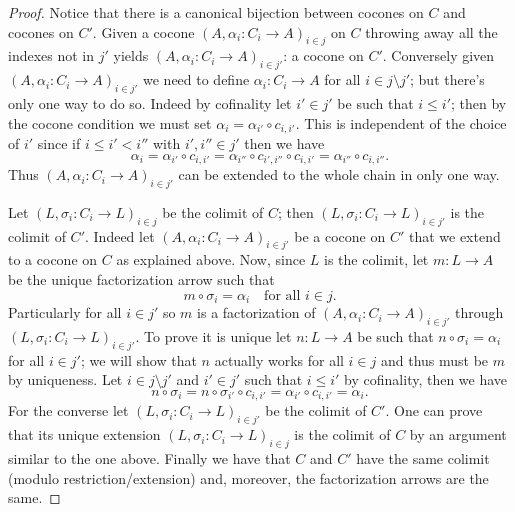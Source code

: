\documentclass[letterpaper, 11pt, oneside]{memoir}
\theoremstyle{myteo}
\numberwithin{equation}{section}
\begin{document}
\begin{proof}
  Notice that there is a canonical bijection between cocones on \(C\) and cocones on \(C'\).
  Given a cocone \((A, \alpha_i : C_i \to A)_{i \in j}\) on \(C\) throwing away all the indexes not in \(j'\) yields \((A, \alpha_i : C_i \to A)_{i \in j'}\): a cocone on \(C'\).
  Conversely given \((A, \alpha_i : C_i \to A)_{i \in j'}\) we need to define \(\alpha_i : C_i \to A\) for all \(i \in j \setminus j'\); but there's only one way to do so.
  Indeed by cofinality let \(i' \in j'\) be such that \(i \leq i'\); then by the cocone condition we must set \(\alpha_i = \alpha_{i'} \circ c_{i,i'}\).
  This is independent of the choice of \(i'\) since if \(i \leq i' < i''\) with \(i', i'' \in j'\) then we have
  \begin{equation*}
    \alpha_i = \alpha_{i'} \circ c_{i, i'} = \alpha_{i''} \circ c_{i', i''} \circ c_{i, i'} = \alpha_{i''} \circ c_{i, i''}.
  \end{equation*}
  Thus \((A, \alpha_{i}:C_i \to A)_{i \in j'}\) can be extended to the whole chain in only one way.

  Let \((L, \sigma_i : C_i \to L)_{i \in j}\) be the colimit of \(C\); then \((L, \sigma_i : C_i \to L)_{i \in j'}\) is the colimit of \(C'\).
  Indeed let \((A, \alpha_i : C_i \to A)_{i \in j'}\) be a cocone on \(C'\) that we extend to a cocone on \(C\) as explained above.
  Now, since \(L\) is the colimit, let \(m \colon L \to A\) be the unique factorization arrow such that
  \begin{equation*}
    m \circ \sigma_i = \alpha_i \quad \text{for all \(i \in j\)}.
  \end{equation*}
  Particularly for all \(i \in j'\) so \(m\) is a factorization of \((A, \alpha_i : C_i \to A)_{i \in j'}\) through \((L, \sigma_i : C_i \to L)_{i \in j'}\).
  To prove it is unique let \(n \colon L \to A\) be such that \(n \circ \sigma_i = \alpha_i\) for all \(i \in j'\); we will show that \(n\) actually works for all \(i \in j\) and thus must be \(m\) by uniqueness.
  Let \(i \in j \setminus j'\) and \(i' \in j'\) such that \(i \leq i'\) by cofinality, then we have
  \begin{equation*}
    n \circ \sigma_i = n \circ \sigma_{i'} \circ c_{i, i'} = \alpha_{i'} \circ c_{i,i'} = \alpha_i.
  \end{equation*}
  For the converse let \((L, \sigma_i : C_i \to L)_{i \in j'}\) be the colimit of \(C'\).
  One can prove that its unique extension \((L, \sigma_i : C_i \to L)_{i \in j}\) is the colimit of \(C\) by an argument similar to the one above.
  Finally we have that \(C\) and \(C'\) have the same colimit (modulo restriction/extension) and, moreover, the factorization arrows are the same.
\end{proof}
\end{document}

